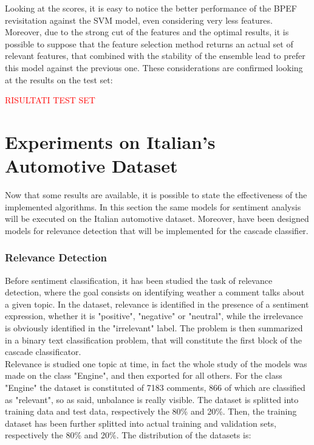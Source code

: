 Looking at the scores, it is easy to notice the better performance of the BPEF revisitation against the SVM model, even considering very less features. Moreover, due to the strong cut of the features and the optimal results, it is possible to suppose that the feature selection method returns an actual set of relevant features, that combined with the stability of the ensemble lead to prefer this model against the previous one. These considerations are confirmed looking at the results on the test set:

\textcolor{red}{RISULTATI TEST SET}


\section{Experiments on Italian's Automotive Dataset}

Now that some results are available, it is possible to state the effectiveness of the implemented algorithms. In this section the same models for sentiment analysis will be executed on the Italian automotive dataset. Moreover, have been designed models for relevance detection that will be implemented for the cascade classifier.\\

\subsubsection{Relevance Detection}

Before sentiment classification, it has been studied the task of relevance detection, where the goal consists on identifying weather a comment talks about a given topic. In the dataset, relevance is identified in the presence of a sentiment expression, whether it is "positive", "negative" or "neutral", while the irrelevance is obviously identified in the "irrelevant" label. The problem is then summarized in a binary text classification problem, that will constitute the first block of the cascade classificator.\\
Relevance is studied one topic at time, in fact the whole study of the models was made on the class "Engine", and then exported for all others. For the class "Engine" the dataset is constituted of 7183 comments, 866 of which are classified as "relevant", so as said, unbalance is really visible. The dataset is splitted into training data and test data, respectively the 80\% and 20\%. Then, the training dataset has been further splitted into actual training and validation sets, respectively the 80\% and 20\%. The distribution of the datasets is:

